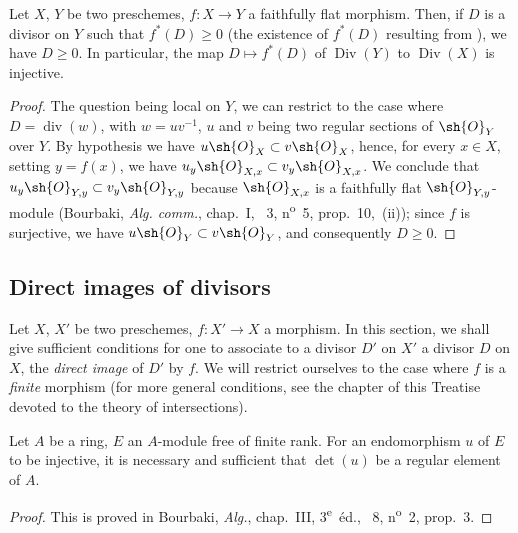 \begin{proposition}[21.4.8]
\label{IV.21.4.8}
Let $X$, $Y$ be two preschemes, $f:X\to Y$ a faithfully flat morphism.
Then, if $D$ is a divisor on $Y$ such that $f^*(D)\geq 0$ (the existence of $f^*(D)$ resulting from ), we have $D\geq 0$.
In particular, the map $D\mapsto f^*(D)$ of $\operatorname{Div}(Y)$ to $\operatorname{Div}(X)$ is injective.
\end{proposition}

\begin{proof}
The question being local on $Y$, we can restrict to the case where $D=\operatorname{div}(w)$, with $w=uv^{-1}$, $u$ and $v$ being two regular sections of $\sh{O}_Y$ over $Y$.
By hypothesis we have $u\sh{O}_X\subset v\sh{O}_X$, hence, for every $x\in X$, setting $y=f(x)$, we have $u_y\sh{O}_{X,x}\subset v_y\sh{O}_{X,x}$.
We conclude that $u_y\sh{O}_{Y,y}\subset v_y\sh{O}_{Y,y}$ because $\sh{O}_{X,x}$ is a faithfully flat $\sh{O}_{Y,y}$-module (Bourbaki, \emph{Alg. comm.}, chap.~I, \textsection~3, n\textsuperscript{o}~5, prop.~10,~(ii));
since $f$ is surjective, we have $u\sh{O}_Y\subset v\sh{O}_Y$, and consequently $D\geq 0$.
\end{proof}



\subsection{Direct images of divisors}
\label{subsection:IV.21.5}
\label{IV.21.5}

\begin{env}[21.5.1]
\label{IV.21.5.1}
Let $X$, $X'$ be two preschemes, $f:X'\to X$ a morphism.
In this section, we shall give sufficient conditions for one to associate to a divisor $D'$ on $X'$ a divisor $D$ on $X$, the \emph{direct image} of $D'$ by $f$.
We will restrict ourselves to the case where $f$ is a \emph{finite} morphism (for more general conditions, see the chapter of this Treatise devoted to the theory of intersections).
\end{env}

\begin{lemma}[21.5.2]
\label{IV.21.5.2}
Let $A$ be a ring, $E$ an $A$-module free of finite rank.
For an endomorphism $u$ of $E$ to be injective, it is necessary and sufficient that $\det(u)$ be a regular element of $A$.
\end{lemma}

\begin{proof}
This is proved in Bourbaki, \emph{Alg.}, chap.~III, 3\textsuperscript{e}~\'{e}d., \textsection~8, n\textsuperscript{o}~2, prop.~3.
\end{proof}

